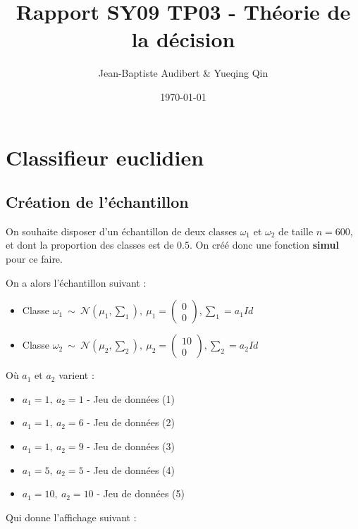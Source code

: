 \documentclass[a4paper,11pt]{article}
\title{Rapport SY09 TP03 - Théorie de la décision}
\author{Jean-Baptiste Audibert \& Yueqing Qin}
\date{\today}
\begin{document}
\maketitle

\section{Classifieur euclidien} 

\subsection{Création de l'échantillon}

\noindent On souhaite disposer d'un échantillon de deux classes $\omega_1$ et $\omega_2$ de taille $n=600$, et dont la proportion des classes est de $0.5$. On créé donc une fonction \textbf{simul} pour ce faire.

\noindent On a alors l'échantillon suivant : 

\begin{itemize}
\item Classe $\omega_1 \  \sim \ \mathcal{N}( \mu_1, \sum_1), \ \mu_1 = 
   \left (
   \begin{array}{ccc}
      0 \\
      0
   \end{array}
   \right ),
\sum_1 = a_1 Id$
\item Classe $\omega_2 \  \sim  \ \mathcal{N}( \mu_2, \sum_2), \ \mu_2 = 
   \left (
   \begin{array}{ccc}
     10 \\
     0
   \end{array}
   \right )
, \sum_2 = a_2 Id$ \\
\end{itemize}

\noindent Où $a_1$ et $a_2$ varient : 

\begin{itemize}
\item $a_1=1, \ a_2 = 1$ - Jeu de données (1) 
\item $a_1=1, \ a_2 = 6$ - Jeu de données (2) 
\item $a_1=1, \ a_2 = 9$ - Jeu de données (3) 
\item $a_1=5, \ a_2 = 5$ - Jeu de données (4) 
\item $a_1=10, \ a_2 = 10$ - Jeu de données (5) \\
\end{itemize}

\noindent Qui donne l'affichage suivant : 
\end{document}
